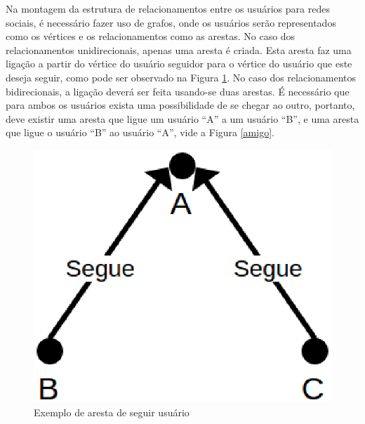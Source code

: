 Na montagem da estrutura de relacionamentos entre os usuários para redes sociais, é necessário fazer uso de grafos, onde os usuários serão representados como os vértices e os relacionamentos como as arestas. No caso dos relacionamentos unidirecionais, apenas uma aresta é criada. Esta aresta faz uma ligação a partir do vértice do usuário seguidor para o vértice do usuário que este deseja seguir, como pode ser observado na Figura \ref{segue}. No caso dos relacionamentos bidirecionais, a ligação deverá ser feita usando-se duas arestas. É necessário que para ambos os usuários exista uma possibilidade de se chegar ao outro, portanto, deve existir uma aresta que ligue um usuário ``A'' a um usuário ``B'', e uma aresta que ligue o usuário ``B'' ao usuário ``A'', vide a Figura \ref{amigo}.

\begin{figure}[!h]
	\centering
	\includegraphics[scale=0.45]{figuras/proposta/segue.eps}
	\caption{Exemplo de aresta de seguir usuário}
	\label{segue}
\end{figure}

